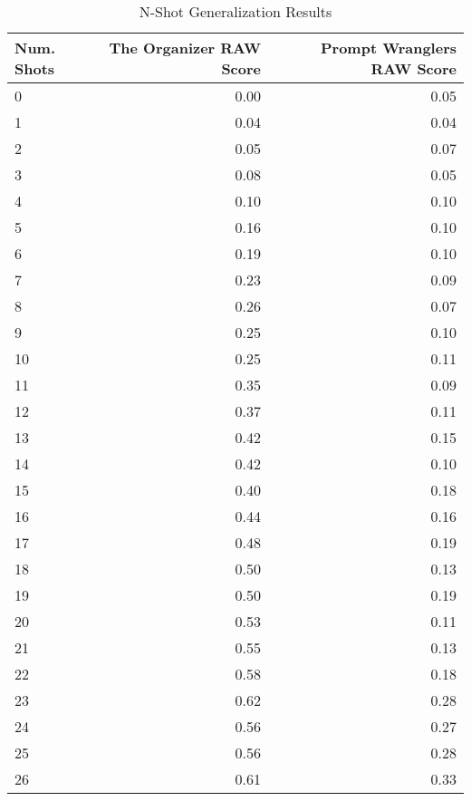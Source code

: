 \begin{table}[h!]
\centering
\begin{tabular}{lrr}
Num. Shots & The Organizer RAW Score & Prompt Wranglers RAW Score \\
\hline
0 & 0.00 & 0.05 \\
1 & 0.04 & 0.04 \\
2 & 0.05 & 0.07 \\
3 & 0.08 & 0.05 \\
4 & 0.10 & 0.10 \\
5 & 0.16 & 0.10 \\
6 & 0.19 & 0.10 \\
7 & 0.23 & 0.09 \\
8 & 0.26 & 0.07 \\
9 & 0.25 & 0.10 \\
10 & 0.25 & 0.11 \\
11 & 0.35 & 0.09 \\
12 & 0.37 & 0.11 \\
13 & 0.42 & 0.15 \\
14 & 0.42 & 0.10 \\
15 & 0.40 & 0.18 \\
16 & 0.44 & 0.16 \\
17 & 0.48 & 0.19 \\
18 & 0.50 & 0.13 \\
19 & 0.50 & 0.19 \\
20 & 0.53 & 0.11 \\
21 & 0.55 & 0.13 \\
22 & 0.58 & 0.18 \\
23 & 0.62 & 0.28 \\
24 & 0.56 & 0.27 \\
25 & 0.56 & 0.28 \\
26 & 0.61 & 0.33 \\
\end{tabular}
\caption{N-Shot Generalization Results}
\label{tab:n_shot_generalization}
\end{table}